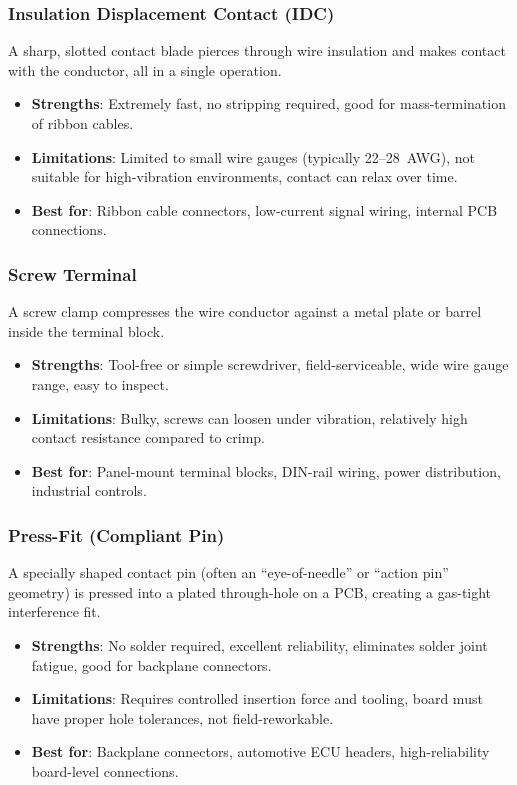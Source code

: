 \documentclass[11pt,letterpaper,twoside,openany]{book}
\begin{document}
\subsubsection{Insulation Displacement Contact (IDC)}

A sharp, slotted contact blade pierces through wire insulation and makes contact with the conductor, all in a single operation.

\begin{itemize}[nosep,leftmargin=1.5em]
  \item \textbf{Strengths}: Extremely fast, no stripping required, good for mass-termination of ribbon cables.
  \item \textbf{Limitations}: Limited to small wire gauges (typically 22--28~AWG), not suitable for high-vibration environments, contact can relax over time.
  \item \textbf{Best for}: Ribbon cable connectors, low-current signal wiring, internal PCB connections.
\end{itemize}

\subsubsection{Screw Terminal}

A screw clamp compresses the wire conductor against a metal plate or barrel inside the terminal block.

\begin{itemize}[nosep,leftmargin=1.5em]
  \item \textbf{Strengths}: Tool-free or simple screwdriver, field-serviceable, wide wire gauge range, easy to inspect.
  \item \textbf{Limitations}: Bulky, screws can loosen under vibration, relatively high contact resistance compared to crimp.
  \item \textbf{Best for}: Panel-mount terminal blocks, DIN-rail wiring, power distribution, industrial controls.
\end{itemize}

\subsubsection{Press-Fit (Compliant Pin)}

A specially shaped contact pin (often an ``eye-of-needle'' or ``action pin'' geometry) is pressed into a plated through-hole on a PCB, creating a gas-tight interference fit.

\begin{itemize}[nosep,leftmargin=1.5em]
  \item \textbf{Strengths}: No solder required, excellent reliability, eliminates solder joint fatigue, good for backplane connectors.
  \item \textbf{Limitations}: Requires controlled insertion force and tooling, board must have proper hole tolerances, not field-reworkable.
  \item \textbf{Best for}: Backplane connectors, automotive ECU headers, high-reliability board-level connections.
\end{itemize}
\end{document}
